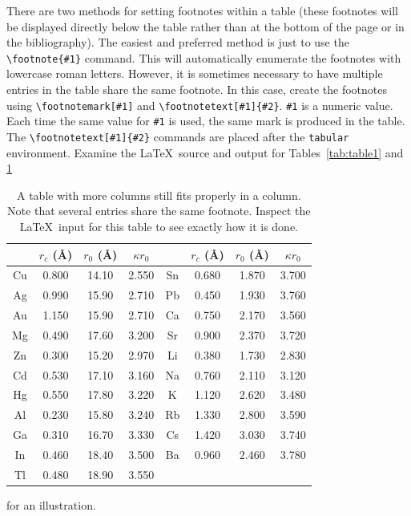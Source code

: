 \documentclass[%
 aip,
 amsmath,amssymb,
 reprint,%
]{revtex4-2}
\begin{document}
There are two methods for setting footnotes within a table (these
footnotes will be displayed directly below the table rather than at
the bottom of the page or in the bibliography).
The easiest
and preferred method is just to use the \verb+\footnote{#1}+
command. This will automatically enumerate the footnotes with
lowercase roman letters.
However, it is sometimes necessary to have
multiple entries in the table share the same footnote.
In this case,
create the footnotes using
\verb+\footnotemark[#1]+ and \verb+\footnotetext[#1]{#2}+.
\texttt{\#1} is a numeric value.
Each time the same value for \texttt{\#1} is used, 
the same mark is produced in the table. 
The \verb+\footnotetext[#1]{#2}+ commands are placed after the \texttt{tabular}
environment. 
Examine the \LaTeX\ source and output for Tables~\ref{tab:table1} and 
\ref{tab:table2}%
\begin{table}
\caption{\label{tab:table2}A table with more columns still fits
properly in a column. Note that several entries share the same
footnote. Inspect the \LaTeX\ input for this table to see
exactly how it is done.}
\begin{ruledtabular}
\begin{tabular}{cccccccc}
 &$r_c$ (\AA)&$r_0$ (\AA)&$\kappa r_0$&
 &$r_c$ (\AA) &$r_0$ (\AA)&$\kappa r_0$\\
\hline
Cu& 0.800 & 14.10 & 2.550 &Sn\footnotemark[1]
& 0.680 & 1.870 & 3.700 \\
Ag& 0.990 & 15.90 & 2.710 &Pb\footnotemark[2]
& 0.450 & 1.930 & 3.760 \\
Au& 1.150 & 15.90 & 2.710 &Ca\footnotemark[3]
& 0.750 & 2.170 & 3.560 \\
Mg& 0.490 & 17.60 & 3.200 &Sr\footnotemark[4]
& 0.900 & 2.370 & 3.720 \\
Zn& 0.300 & 15.20 & 2.970 &Li\footnotemark[2]
& 0.380 & 1.730 & 2.830 \\
Cd& 0.530 & 17.10 & 3.160 &Na\footnotemark[5]
& 0.760 & 2.110 & 3.120 \\
Hg& 0.550 & 17.80 & 3.220 &K\footnotemark[5]
&  1.120 & 2.620 & 3.480 \\
Al& 0.230 & 15.80 & 3.240 &Rb\footnotemark[3]
& 1.330 & 2.800 & 3.590 \\
Ga& 0.310 & 16.70 & 3.330 &Cs\footnotemark[4]
& 1.420 & 3.030 & 3.740 \\
In& 0.460 & 18.40 & 3.500 &Ba\footnotemark[5]
& 0.960 & 2.460 & 3.780 \\
Tl& 0.480 & 18.90 & 3.550 & & & & \\
\end{tabular}
\end{ruledtabular}
\end{table}
for an illustration. 
\end{document}
